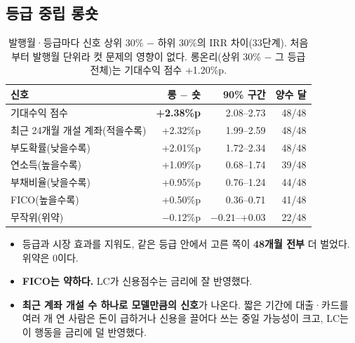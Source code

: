 \subsection*{등급 중립 롱숏}
\begin{table}[H]\centering\small
\begin{tabular}{@{}lrrr@{}}\toprule
신호 & 롱 $-$ 숏 & 90\% 구간 & 양수 달\\\midrule
기대수익 점수 & \textbf{+2.38\%p} & 2.08--2.73 & 48/48\\
최근 24개월 개설 계좌(적을수록) & +2.32\%p & 1.99--2.59 & 48/48\\
부도확률(낮을수록) & +2.01\%p & 1.72--2.34 & 48/48\\
연소득(높을수록) & +1.09\%p & 0.68--1.74 & 39/48\\
부채비율(낮을수록) & +0.95\%p & 0.76--1.24 & 44/48\\
FICO(높을수록) & +0.50\%p & 0.36--0.71 & 41/48\\
무작위(위약) & $-0.12$\%p & $-0.21$--$+0.03$ & 22/48\\\bottomrule
\end{tabular}
\caption{발행월·\allowbreak{}등급마다 신호 상위 30\% $-$ 하위 30\%의 IRR 차이(33단계). 처음부터 발행월 단위라 컷 문제의 영향이 없다. 롱온리(상위 30\% $-$ 그 등급 전체)는 기대수익 점수 +1.20\%p.}
\end{table}

\begin{keybox}[이 표가 말하는 것]
\begin{itemize}[leftmargin=*]
\item 등급과 시장 효과를 지워도, 같은 등급 안에서 고른 쪽이 \textbf{48개월 전부} 더 벌었다. 위약은 0이다.
\item \textbf{FICO는 약하다.} LC가 신용점수는 금리에 잘 반영했다.
\item \textbf{최근 계좌 개설 수 하나로 모델만큼의 신호}가 나온다. 짧은 기간에 대출·\allowbreak{}카드를 여러 개 연 사람은 돈이 급하거나 신용을 끌어다 쓰는 중일 가능성이 크고, LC는 이 행동을 금리에 덜 반영했다.
\end{itemize}
\end{keybox}

